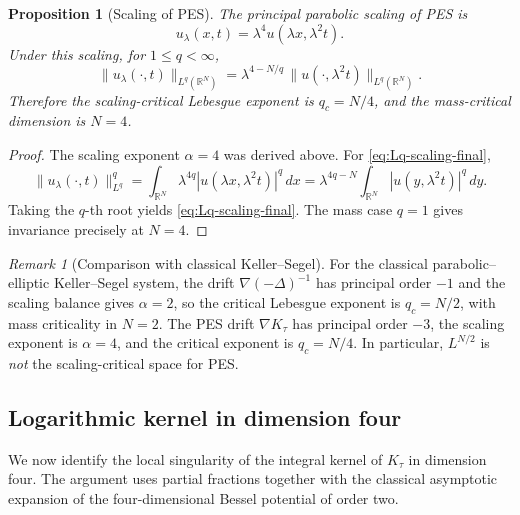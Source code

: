 \documentclass[11pt,reqno]{amsart}
\newtheorem{proposition}[theorem]{Proposition}
\theoremstyle{definition}
\theoremstyle{remark}
\newtheorem{remark}[theorem]{Remark}
\newcommand{\R}{\mathbb{R}}
\begin{document}
\begin{proposition}[Scaling of PES]\label{prop:PES-scaling}
The principal parabolic scaling of PES is
\begin{equation}\label{eq:PES-scaling-final}
        u_\lambda(x,t)=\lambda^{4}u(\lambda x,\lambda^{2}t).
\end{equation}
Under this scaling, for $1\le q<\infty$,
\begin{equation}\label{eq:Lq-scaling-final}
        \|u_\lambda(\cdot,t)\|_{L^{q}(\R^{N})}
        =\lambda^{4-N/q}\,\|u(\cdot,\lambda^{2}t)\|_{L^{q}(\R^{N})}.
\end{equation}
Therefore the scaling-critical Lebesgue exponent is $q_c=N/4$, and the mass-critical dimension is $N=4$.
\end{proposition}

\begin{proof}
The scaling exponent $\alpha=4$ was derived above. For \eqref{eq:Lq-scaling-final},
\[
        \|u_\lambda(\cdot,t)\|_{L^{q}}^{q}
        =\int_{\R^{N}}\lambda^{4q}|u(\lambda x,\lambda^{2}t)|^{q}\,dx
        =\lambda^{4q-N}\int_{\R^{N}}|u(y,\lambda^{2}t)|^{q}\,dy.
\]
Taking the $q$-th root yields \eqref{eq:Lq-scaling-final}. The mass case $q=1$ gives invariance precisely at $N=4$.
\end{proof}

\begin{remark}[Comparison with classical Keller--Segel]\label{rem:KS-comparison}
For the classical parabolic--elliptic Keller--Segel system, the drift $\nabla(-\Delta)^{-1}$ has principal order $-1$ and the scaling balance gives $\alpha=2$, so the critical Lebesgue exponent is $q_c=N/2$, with mass criticality in $N=2$. The PES drift $\nabla K_\tau$ has principal order $-3$, the scaling exponent is $\alpha=4$, and the critical exponent is $q_c=N/4$. In particular, $L^{N/2}$ is \emph{not} the scaling-critical space for PES.
\end{remark}

\subsection{Logarithmic kernel in dimension four}
\label{subsec:log-kernel}

We now identify the local singularity of the integral kernel of $K_\tau$ in dimension four. The argument uses partial fractions together with the classical asymptotic expansion of the four-dimensional Bessel potential of order two.
\end{document}
